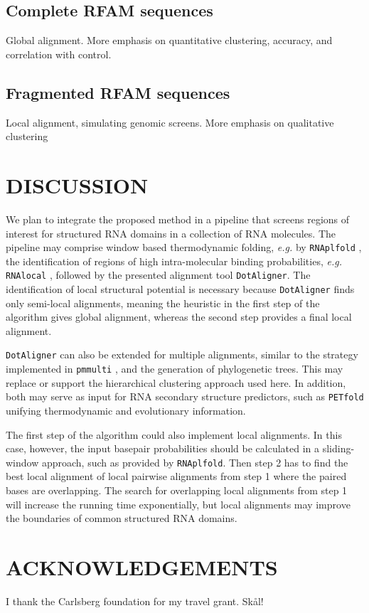 \documentclass[a4paper,twoside]{article}
\newcommand\dotaligner{\texttt{DotAligner}}
\newcommand\pmmulti{\texttt{pmmulti}}
\newcommand\rnaplfold{\texttt{RNAplfold}}
\newcommand\petfold{\texttt{PETfold}}
\newcommand\rnalocal{\texttt{RNAlocal}}
\newcommand\eg{\textit{e.g.}}
\begin{document}
\subsection{Complete RFAM sequences}

Global alignment. More emphasis on quantitative clustering, accuracy, and correlation with control. 


\subsection{Fragmented RFAM sequences} 

Local alignment, simulating genomic screens. More emphasis on qualitative clustering



\section{\uppercase{Discussion}}

\noindent We plan to integrate the proposed method in a pipeline that screens
regions of interest for structured RNA domains in a collection of RNA molecules.
The pipeline may comprise window based thermodynamic folding, \eg{} by
\rnaplfold{} \cite{Bernhart:Hofacker:Stadler:Local_RNA_base:2006}, the
identification of regions of high intra-molecular binding probabilities, \eg{}
\rnalocal{} \cite{Dotu19908358}, followed by the presented alignment tool
\dotaligner. The identification of local structural potential is necessary because
\dotaligner{} finds only semi-local alignments, meaning the heuristic in the first
step of the algorithm gives global alignment, whereas the second step provides a
final local alignment. 

\dotaligner{} can also be extended for multiple alignments, similar to the strategy
implemented in \pmmulti{} \cite{Hofacker15073017}, and the generation of
phylogenetic trees. This may replace or support the hierarchical clustering
approach used here. In addition, both may serve as input for RNA secondary
structure predictors, such as \petfold{} \cite{Seemann2008} unifying
thermodynamic and evolutionary information. 

The first step of the algorithm could also implement local alignments. In this
case, however, the input basepair probabilities should be calculated in a
sliding-window approach, such as provided by \rnaplfold.  Then step 2 has to
find the best local alignment of local pairwise alignments from step 1 where the
paired bases are overlapping.  The search for overlapping local alignments from
step 1 will increase the running time exponentially, but local alignments may
improve the boundaries of common structured RNA domains.


\section*{\uppercase{Acknowledgements}}

\noindent I thank the Carlsberg foundation for my travel grant. Sk\aa l!


\vfill

{\small
}


\vfill
\end{document}
